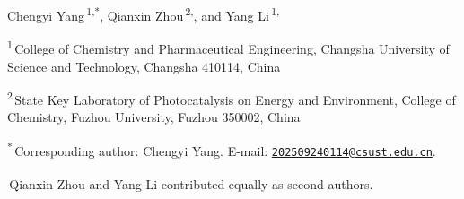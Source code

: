 {\normalsize Chengyi Yang\,\textsuperscript{1,*}, Qianxin Zhou\,\textsuperscript{2,\textdagger}, and Yang Li\,\textsuperscript{1,\textdagger}\par}
\vspace{0.4em}
{\small \textsuperscript{1}\,College of Chemistry and Pharmaceutical Engineering, Changsha University of Science and Technology, Changsha 410114, China\par
\textsuperscript{2}\,State Key Laboratory of Photocatalysis on Energy and Environment, College of Chemistry, Fuzhou University, Fuzhou 350002, China\par}
\vspace{0.3em}
{\footnotesize \textsuperscript{*}\,Corresponding author: Chengyi Yang. E-mail: \href{mailto:202509240114@csust.edu.cn}{\nolinkurl{202509240114@csust.edu.cn}}.\par}
{\footnotesize \textsuperscript{\textdagger}\,Qianxin Zhou and Yang Li contributed equally as second authors.\par}
